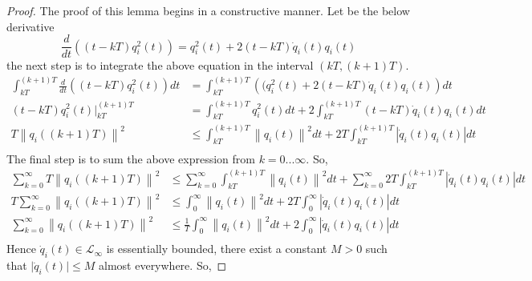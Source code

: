     \begin{proof}
        The proof of this lemma begins in a constructive manner. Let be the below derivative
        \begin{equation*}
            \frac{d}{dt}\left((t - kT)q_i^2(t)\right) = q_i^2(t) + 2(t - kT)\dot{q}_i(t)q_i(t)
        \end{equation*}
        the next step is to integrate the above equation in the interval $(kT, (k+1)T)$.
        \begin{equation*}
            \begin{align*}
                \int_{kT}^{(k+1)T} \frac{d}{dt}\left((t - kT)q_i^2(t)\right) dt &= \int_{kT}^{(k+1)T} \left((q_i^2(t) + 2(t - kT)\dot{q}_i(t)q_i(t)\right) dt\\
                (t - kT)q_i^2(t)\bigg|_{kT}^{(k+1)T} &= \int_{kT}^{(k+1)T} q_i^2(t)dt + 2\int_{kT}^{(k+1)T}(t - kT)\dot{q}_i(t)q_i(t)dt\\
                T\left\lVert q_i((k+1)T)\right\rVert^2 &\leq  \int_{kT}^{(k+1)T} \left\lVert q_i(t)\right\rVert^2dt + 2T\int_{kT}^{(k+1)T}\left\lvert\dot{q}_i(t)q_i(t) \right\rvert dt\\
            \end{align*}
        \end{equation*}
        The final step is to sum the above expression from $k = 0...\infty$. So,
        \begin{equation*}
            \begin{align*}
                \sum_{k = 0}^{\infty} T\left\lVert q_i((k+1)T)\right\rVert^2 &\leq \sum_{k = 0}^{\infty} \int_{kT}^{(k+1)T} \left\lVert q_i(t)\right\rVert^2dt + \sum_{k = 0}^{\infty} 2T\int_{kT}^{(k+1)T}\left\lvert\dot{q}_i(t)q_i(t) \right\rvert dt\\
                T\sum_{k = 0}^{\infty} \left\lVert q_i((k+1)T)\right\rVert^2 &\leq  \int_{0}^{\infty} \left\lVert q_i(t)\right\rVert^2dt + 2T \int_{0}^{\infty}\left\lvert\dot{q}_i(t)q_i(t) \right\rvert dt\\
                \sum_{k = 0}^{\infty} \left\lVert q_i((k+1)T)\right\rVert^2 &\leq  \frac{1}{T}\int_{0}^{\infty} \left\lVert q_i(t)\right\rVert^2dt + 2 \int_{0}^{\infty}\left\lvert\dot{q}_i(t)q_i(t) \right\rvert dt\\
            \end{align*}
        \end{equation*}
        Hence $\dot{q}_i(t) \in \mathcal{L}_{\infty}$ is essentially bounded, there exist a constant $M > 0$ such that $\lvert \dot{q}_i(t) \rvert \leq M$ almost everywhere. So,

\end{proof}
